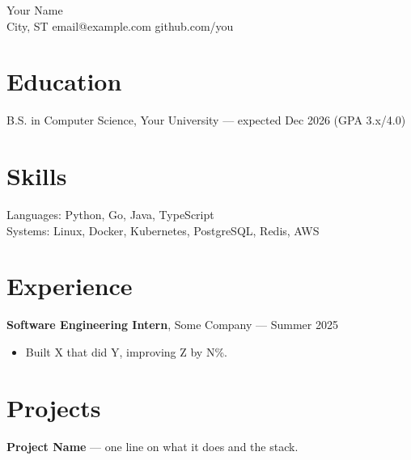 \documentclass[11pt]{article}
\begin{document}
\begin{center}
  {\LARGE Your Name}\\
  City, ST \quad email@example.com \quad github.com/you
\end{center}

\section*{Education}
B.S. in Computer Science, Your University — expected Dec 2026 (GPA 3.x/4.0)

\section*{Skills}
Languages: Python, Go, Java, TypeScript \\
Systems: Linux, Docker, Kubernetes, PostgreSQL, Redis, AWS

\section*{Experience}
\textbf{Software Engineering Intern}, Some Company — Summer 2025
\begin{itemize}
  \item Built X that did Y, improving Z by N\%.
\end{itemize}

\section*{Projects}
\textbf{Project Name} — one line on what it does and the stack.
\end{document}
